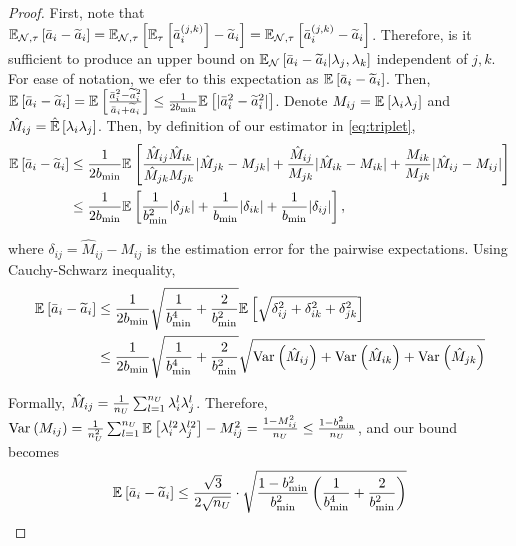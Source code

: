 \begin{proof}
First, note that $\mathbb{E}_{\mathcal{N}, \tau}\left[\bar{a}_i - \widetilde{a}_i\right] = \mathbb{E}_{\mathcal{N}, \tau}\left[\mathbb{E}_{\tau}\left[\bar{a}_i^{(j, k)}\right] - \widetilde{a}_i\right] = \mathbb{E}_{\mathcal{N}, \tau}\left[\bar{a}_i^{(j, k)} - \widetilde{a}_i\right]$. Therefore, is it sufficient to produce an upper bound on $\mathbb{E}_{\mathcal{N}}\left[\bar{a}_i - \widetilde{a}_i | \lambda_j, \lambda_k\right]$ independent of $j, k$. For ease of notation, we efer to this expectation as $\mathbb{E}_{}\left[\bar{a}_i - \widetilde{a}_i\right]$. Then, $\mathbb{E}_{}\left[\bar{a}_i - \widetilde{a}_i\right] = \mathbb{E}_{}\left[ \frac{\bar{a}_i^2 - \widetilde{a}_i^2}{\bar{a}_i + \widetilde{a}_i} \right] \le  \frac{1}{2b_{\min}} \mathbb{E}_{}\left[|\bar{a}_i^2 - \widetilde{a}_i^2 |\right]$. Denote $M_{ij} = \mathbb{E}_{}\left[\lambda_i \lambda_j\right]$ and $\hat{M}_{ij} = \hat{\mathbb{E}}\left[\lambda_i \lambda_j\right]$. Then, by definition of our estimator in \eqref{eq:triplet},
\begin{align}
    \mathbb{E}_{}\left[\bar{a}_i - \widetilde{a}_i\right] &\le \frac{1}{2b_{\min}} \mathbb{E}_{}\left[\frac{\hat{M}_{ij} \hat{M}_{ik}}{\hat{M}_{jk} M_{jk}} |\hat{M}_{jk} - M_{jk}| + \frac{\hat{M}_{ij}}{M_{jk}}|\hat{M}_{ik} - M_{ik}| + \frac{M_{ik}}{M_{jk}} |\hat{M}_{ij} - M_{ij} | \right] \label{eq:M_decomposition} \\
    &\le \frac{1}{2b_{\min}} \mathbb{E}_{}\left[\frac{1}{b_{\min}^2} |\delta_{jk}| + \frac{1}{b_{\min}} |\delta_{ik} | + \frac{1}{b_{\min}}|\delta_{ij} |\right],\nonumber
\end{align}

where $\delta_{ij} = \hat{M}_{ij} - M_{ij}$ is the estimation error for the pairwise expectations. Using Cauchy-Schwarz inequality,
\begin{align*}
    \mathbb{E}_{}\left[\bar{a}_i - \widetilde{a}_i\right] &\le \frac{1}{2b_{\min}} \sqrt{\frac{1}{b_{\min}^4} + \frac{2}{b_{\min}^2}} \mathbb{E}_{}\left[\sqrt{\delta_{ij}^2 + \delta_{ik}^2 + \delta_{jk}^2}\right] \\
    &\le \frac{1}{2b_{\min}} \sqrt{\frac{1}{b_{\min}^4} + \frac{2}{b_{\min}^2}} \sqrt{\mathrm{Var}_{}\left(\hat{M}_{ij}\right) + \mathrm{Var}_{}\left(\hat{M}_{ik}\right) + \mathrm{Var}_{}\left(\hat{M}_{jk}\right)} 
\end{align*}

Formally, $\hat{M}_{ij} = \frac{1}{n_U} \sum_{l = 1}^{n_U} \lambda_i^l \lambda_j^l$. Therefore, $\mathrm{Var}_{}\left(M_{ij}\right) = \frac{1}{n_U^2} \sum_{l = 1}^{n_U} \mathbb{E}_{}\left[\lambda_i^{l2} \lambda_j^{l2}\right] - M_{ij}^2 = \frac{1 - M_{ij}^2}{n_U} \le \frac{1 - b_{\min}^2}{n_U}$, and our bound becomes
\begin{align*}
    \mathbb{E}_{}\left[\bar{a}_i - \widetilde{a}_i\right] \le \frac{\sqrt{3}}{2\sqrt{n_U}} \cdot \sqrt{\frac{1 - b_{\min}^2}{b_{\min}^2} \left(\frac{1}{b_{\min}^4} + \frac{2}{b_{\min}^2} \right)}
\end{align*}



\end{proof}
